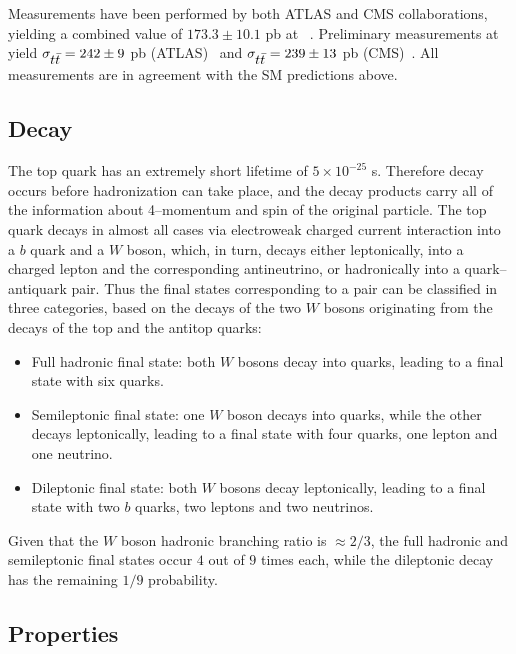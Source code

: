 Measurements have been performed by both ATLAS and CMS
collaborations, yielding a combined value of $173.3\pm10.1$ pb at
\seventev{}~\cite{ATLAS-CONF-2012-134,CMS-PAS-TOP-12-003}. Preliminary
measurements at \eighttev{} yield $\sigma_{\mbox{$t\bar{t}$}{}}=242\pm{}9$ pb
(ATLAS)~\cite{Aad:2014kva} and $\sigma_{\mbox{$t\bar{t}$}{}}=239\pm{}13$ pb
(CMS)~\cite{Chatrchyan:2013faa}. All measurements are in agreement
with the SM predictions above.

\subsection{Decay}
\label{sec:topdecay}

The top quark has an extremely short lifetime of $5\times{}10^{-25}$
s. Therefore decay occurs before hadronization can take place, and the
decay products carry all of the information about \mbox{4--momentum} and spin
of the original particle.
The top quark decays in almost all cases via electroweak
charged current interaction into a $b$ quark and a $W$ boson, which,
in turn, decays either leptonically, into a charged lepton and the corresponding
antineutrino, or hadronically into a quark--antiquark pair. Thus the
final states corresponding to a \ttbar{} pair can be classified in
three categories, based on the decays of the two $W$ bosons
originating from the decays of the top and the antitop quarks:
\begin{itemize}
\item Full hadronic final state: both $W$ bosons decay into quarks,
  leading to a \ttbar{} final state with six quarks.
\item Semileptonic final state: one $W$ boson decays into quarks,
  while the other decays leptonically, leading to a final state with
  four quarks, one lepton and one neutrino.
\item Dileptonic final state: both $W$ bosons decay leptonically,
  leading to a final state with two $b$ quarks, two leptons and two
  neutrinos. 
\end{itemize}
Given that the $W$ boson hadronic branching ratio is
$\approx{}2/3$, the full hadronic and semileptonic final states occur
$4$ out of $9$ times each, while the dileptonic decay has the
remaining $1/9$ probability.  

\subsection{Properties}
\label{sec:topprop}

